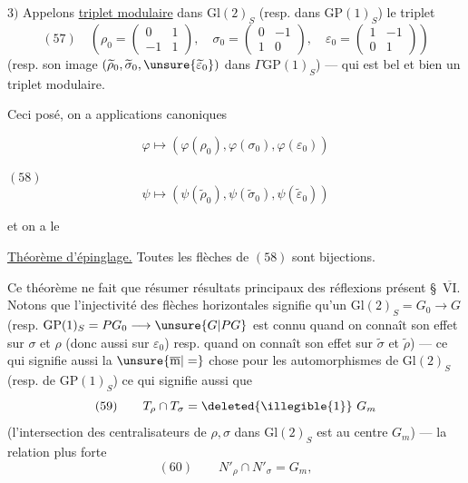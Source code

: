 $3)$ Appelons \uline{triplet modulaire}
\uline{} dans $\mathrm{Gl}(2)_S$
(resp. dans $\mathrm{GP}(1)_S$) le triplet
\[
(57)\quad\left(\rho_0=\begin{pmatrix}0&1\\-1&1\end{pmatrix},\quad
\sigma_0=\begin{pmatrix}0&-1\\1&0\end{pmatrix},\quad
\varepsilon_0=\begin{pmatrix}1&-1\\0&1\end{pmatrix}\right)
\]
(resp. son image $(\widetilde\rho_0,\widetilde\sigma_0,
\unsure{\widetilde\varepsilon_0})$ dans $\Gamma\mathrm{GP}(1)_S$) ---
qui est bel et bien un triplet modulaire.

Ceci posé, on a applications
canoniques


\[
\varphi\longmapsto(\varphi(\rho_0),\varphi(\sigma_0),\varphi(\varepsilon_0))
\]

$(58)$
\[
\psi\longmapsto(\psi(\widetilde\rho_0),\psi(\widetilde\sigma_0),
\psi(\widetilde\varepsilon_0))
\]

et on a le

\uline{Théorème d'épinglage.} Toutes les flèches de $(58)$ sont bijections.

Ce théorème ne fait que résumer 
 résultats principaux des réflexions
 présent \S\ \uline{$\overline{\mathrm{VI}}$}.
Notons que l'injectivité des flèches horizontales signifie 
qu'un 
$\mathrm{Gl}(2)_S=G_0\longrightarrow G$
(resp. $\mathrm{GP}(1)_S=PG_0\longrightarrow\unsure{G|PG}$
est connu quand on connaît son effet sur $\sigma$ et $\rho$
(donc aussi sur $\varepsilon_0$)
\unsure{$\leftarrow$} resp. quand on connaît son effet sur
$\widetilde\sigma$ et $\widetilde\rho$) --- ce qui signifie aussi
la $\unsure{\overline{\mathrm m}|=}$ chose pour les automorphismes de
$\mathrm{Gl}(2)_S$ (resp. de $\mathrm{GP}(1)_S$)
ce qui signifie aussi que
\[
(59)\qquad T_\rho\cap T_\sigma=\deleted{\illegible{1}}\ G_m
\]
(l'intersection des centralisateurs de $\rho,\sigma$ dans
$\mathrm{Gl}(2)_S$ est  au centre $G_m$) ---
 la relation plus forte
\[
(60)\qquad N'_\rho\cap N'_\sigma=G_m,
\]

